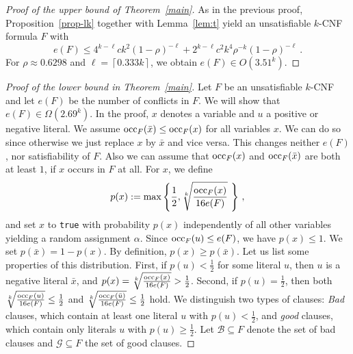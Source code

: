\documentclass[a4paper, 11pt]{article}
\newcommand{\occ}{\ensuremath{{\rm{occ}}}}
\begin{document}
 \begin{proof}[Proof of the upper bound of Theorem~\ref{main}]
   As in the previous proof, Proposition~\ref{prop-lk} together
   with Lemma~\ref{lem:t} yield an unsatisfiable $k$-CNF formula $F$ 
   with 
   $$
   e(F) \leq 4^{k - \ell} ck^2(1-\rho)^{-\ell} + 
   2^{k-\ell} c^2k^4\rho^{-k}(1-\rho)^{-\ell}\ .
   $$
   For $\rho \approx 0.6298$ and $\ell = \left\lceil
     0.333k\right\rceil$, we obtain $e(F) \in O(3.51^k)$.
 \end{proof}
 



\begin{proof}[Proof of the lower bound in Theorem~\ref{main}]
  Let $F$ be an unsatisfiable $k$-CNF and let $e(F)$ be the number of
  conflicts in $F$. We will show that $e(F) \in
  \Omega\left(2.69^k\right)$. In the proof, $x$ denotes a variable and
  $u$ a positive or negative literal.  We assume $\occ_F(\bar{x}) \leq
  \occ_F(x)$ for all variables $x$. We can do so since otherwise we
  just replace $x$ by $\bar{x}$ and vice versa. This changes neither
  $e(F)$, nor satisfiability of $F$. Also we can assume that
  $\occ_F(x)$ and $\occ_F(\bar{x})$ are both at least $1$, if $x$
  occurs in $F$ at all. For $x$, we define
  \[
  p(x) := \max \left\{\frac{1}{2}, 
    \sqrt[k]{\frac{\occ_F(x)}{16e(F)}}\ \right\}\,,
  \]
  and set $x$ to \texttt{true} with probability $p(x)$ independently
  of all other variables yielding a random assignment $\alpha$. Since
  $\occ_F(u) \leq e(F)$, we have $p(x) \leq 1$. We set $p(\bar{x}) = 1
  - p(x)$. By definition, $p(x) \geq p(\bar{x})$.  Let us list some
  properties of this distribution.  First, if $p(u) < \frac{1}{2}$ for
  some literal $u$, then $u$ is a negative literal $\bar{x}$, and
  $p(x) = \sqrt[k]{\frac{\occ_F(x)}{16e(F)}} > \frac{1}{2}$. Second,
  if $p(u) = \frac{1}{2}$, then both
  $\sqrt[k]{\frac{\occ_F(u)}{16e(F)}} \leq \frac{1}{2}$ and
  $\sqrt[k]{\frac{\occ_F(\bar{u})}{16e(F)}} \leq \frac{1}{2}$ hold.
  We distinguish two types of clauses: {\em Bad} clauses, which
  contain at least one literal $u$ with $p(u) < \frac{1}{2}$, and {\em
    good} clauses, which contain only literals $u$ with $p(u) \geq
  \frac{1}{2}$.
Let $\mathcal{B} \subseteq F$ denote the set of bad clauses and $\mathcal{G}\subseteq F$ the set of good clauses.
  


\end{proof}
\end{document}
